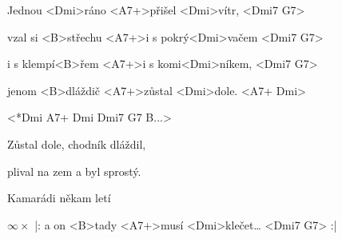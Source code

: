 

\zs
Jednou <Dmi>ráno <A7+>přišel <Dmi>vítr, <Dmi7 G7>

vzal si <B>střechu <A7+>i s pokrý<Dmi>vačem <Dmi7 G7>

i s klempí<B>řem <A7+>i s komi<Dmi>níkem, <Dmi7 G7>

jenom <B>dláždič <A7+>zůstal <Dmi>dole. <A7+ Dmi>
\ks

<*Dmi A7+ Dmi Dmi7 G7 B...>

\zs
Zůstal dole, chodník dláždil,

plival na zem a byl sprostý.

Kamarádi někam letí

$\infty\times$ |: a on <B>tady <A7+>musí <Dmi>klečet…  <Dmi7 G7> :|
\ks

\kp
